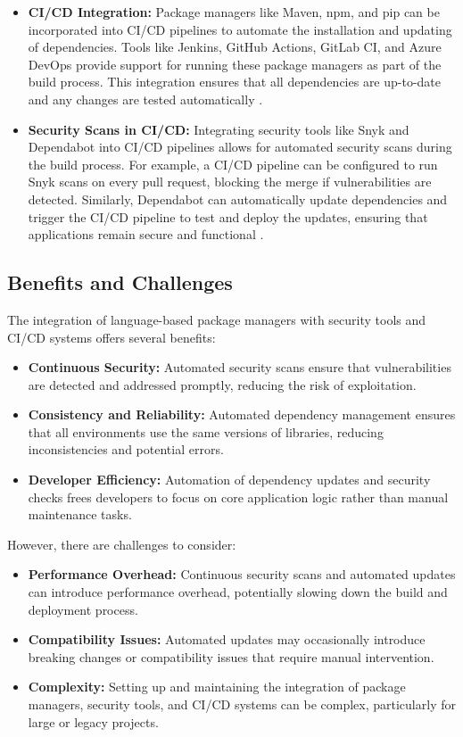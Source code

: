 \documentclass[sigconf]{acmart}
\begin{document}
\begin{itemize}
    \item \textbf{CI/CD Integration:} Package managers like Maven, npm, and pip can be incorporated into CI/CD pipelines to automate the installation and updating of dependencies. Tools like Jenkins, GitHub Actions, GitLab CI, and Azure DevOps provide support for running these package managers as part of the build process. This integration ensures that all dependencies are up-to-date and any changes are tested automatically \cite{ciIntegration2023}.
    \item \textbf{Security Scans in CI/CD:} Integrating security tools like Snyk and Dependabot into CI/CD pipelines allows for automated security scans during the build process. For example, a CI/CD pipeline can be configured to run Snyk scans on every pull request, blocking the merge if vulnerabilities are detected. Similarly, Dependabot can automatically update dependencies and trigger the CI/CD pipeline to test and deploy the updates, ensuring that applications remain secure and functional \cite{snykCI2023}.
\end{itemize}

\subsection{Benefits and Challenges}

The integration of language-based package managers with security tools and CI/CD systems offers several benefits:
\begin{itemize}
    \item \textbf{Continuous Security:} Automated security scans ensure that vulnerabilities are detected and addressed promptly, reducing the risk of exploitation.
    \item \textbf{Consistency and Reliability:} Automated dependency management ensures that all environments use the same versions of libraries, reducing inconsistencies and potential errors.
    \item \textbf{Developer Efficiency:} Automation of dependency updates and security checks frees developers to focus on core application logic rather than manual maintenance tasks.
\end{itemize}

However, there are challenges to consider:
\begin{itemize}
    \item \textbf{Performance Overhead:} Continuous security scans and automated updates can introduce performance overhead, potentially slowing down the build and deployment process.
    \item \textbf{Compatibility Issues:} Automated updates may occasionally introduce breaking changes or compatibility issues that require manual intervention.
    \item \textbf{Complexity:} Setting up and maintaining the integration of package managers, security tools, and CI/CD systems can be complex, particularly for large or legacy projects.
\end{itemize}
\end{document}
